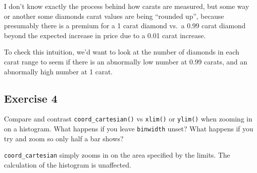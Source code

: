 \documentclass[]{book}
\newenvironment{Shaded}{\begin{snugshade}}{\end{snugshade}}
\newcommand{\CommentTok}[1]{\textcolor[rgb]{0.56,0.35,0.01}{\textit{#1}}}
\newcommand{\DataTypeTok}[1]{\textcolor[rgb]{0.13,0.29,0.53}{#1}}
\newcommand{\DecValTok}[1]{\textcolor[rgb]{0.00,0.00,0.81}{#1}}
\newcommand{\FloatTok}[1]{\textcolor[rgb]{0.00,0.00,0.81}{#1}}
\newcommand{\KeywordTok}[1]{\textcolor[rgb]{0.13,0.29,0.53}{\textbf{#1}}}
\newcommand{\NormalTok}[1]{#1}
\newcommand{\OperatorTok}[1]{\textcolor[rgb]{0.81,0.36,0.00}{\textbf{#1}}}
\newcommand{\StringTok}[1]{\textcolor[rgb]{0.31,0.60,0.02}{#1}}
\theoremstyle{definition}
\theoremstyle{definition}
\theoremstyle{definition}
\theoremstyle{remark}
\begin{document}
I don't know exactly the process behind how carats are measured, but
some way or another some diamonds carat values are being ``rounded up'',
because presumably there is a premium for a 1 carat diamond vs.~a 0.99
carat diamond beyond the expected increase in price due to a 0.01 carat
increase.

To check this intuition, we'd want to look at the number of diamonds in
each carat range to seem if there is an abnormally low number at 0.99
carats, and an abnormally high number at 1 carat.

\begin{Shaded}
\end{Shaded}

\hypertarget{exercise-4-6}{%
\subsection{Exercise 4}\label{exercise-4-6}}

Compare and contrast \texttt{coord\_cartesian()} vs \texttt{xlim()} or
\texttt{ylim()} when zooming in on a histogram. What happens if you
leave \texttt{binwidth} unset? What happens if you try and zoom so only
half a bar shows?

\texttt{coord\_cartesian} simply zooms in on the area specified by the
limits. The calculation of the histogram is unaffected.
\end{document}
